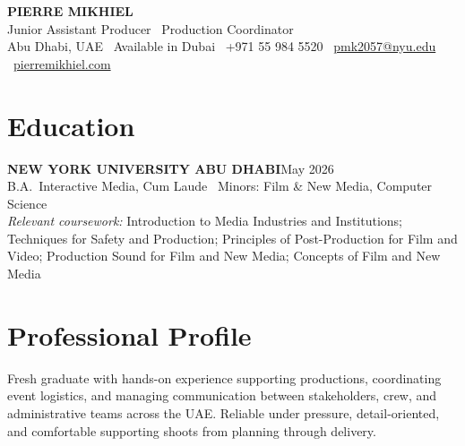 \documentclass[letterpaper,10pt]{article}
\begin{document}
\begin{center}
  {\LARGE\textbf{PIERRE MIKHIEL}}\\[3pt]
  Junior Assistant Producer \textbar\ Production Coordinator\\[2pt]
  {\small
    Abu Dhabi, UAE \textbar\ Available in Dubai \textbar\
    +971 55 984 5520 \textbar\
    \href{mailto:pmk2057@nyu.edu}{pmk2057@nyu.edu} \textbar\
    \href{https://pierremikhiel.com}{pierremikhiel.com}
  }
\end{center}

\vspace{2pt}

\section{Education}

\noindent\textbf{NEW YORK UNIVERSITY ABU DHABI}\hfill May 2026\\
B.A.\ Interactive Media, Cum Laude \textbar\ Minors: Film \& New Media, Computer Science\\
\textit{Relevant coursework:} Introduction to Media Industries and Institutions; Techniques for Safety and Production; Principles of Post-Production for Film and Video; Production Sound for Film and New Media; Concepts of Film and New Media

\section{Professional Profile}

Fresh graduate with hands-on experience supporting productions, coordinating
event logistics, and managing communication between stakeholders, crew, and
administrative teams across the UAE. Reliable under pressure, detail-oriented,
and comfortable supporting shoots from planning through delivery.

\end{document}
